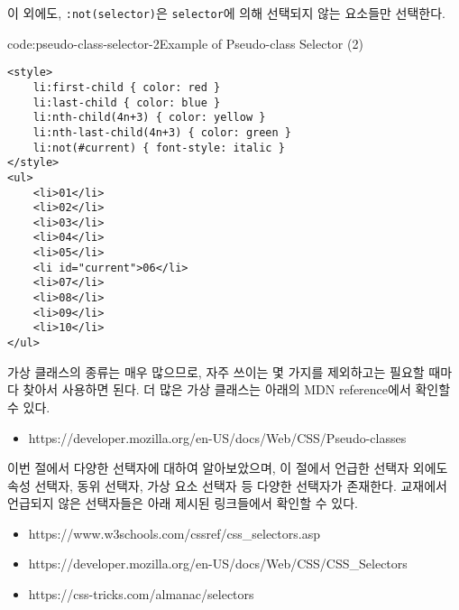 이 외에도, \texttt{:not(selector)}은 \texttt{selector}에 의해 선택되지 않는 요소들만 선택한다.

\begin{codeenv}{code:pseudo-class-selector-2}{Example of Pseudo-class Selector (2)}\begin{verbatim}
<style>
    li:first-child { color: red }
    li:last-child { color: blue }
    li:nth-child(4n+3) { color: yellow }
    li:nth-last-child(4n+3) { color: green }
    li:not(#current) { font-style: italic }
</style>
<ul>
    <li>01</li>
    <li>02</li>
    <li>03</li>
    <li>04</li>
    <li>05</li>
    <li id="current">06</li>
    <li>07</li>
    <li>08</li>
    <li>09</li>
    <li>10</li>
</ul>
\end{verbatim}
\end{codeenv}

가상 클래스의 종류는 매우 많으므로, 자주 쓰이는 몇 가지를 제외하고는 필요할 때마다 찾아서 사용하면 된다. 더 많은 가상 클래스는 아래의 MDN reference에서 확인할 수 있다. 

\begin{itemize}
    \item https://developer.mozilla.org/en-US/docs/Web/CSS/Pseudo-classes
\end{itemize}

이번 절에서 다양한 선택자에 대하여 알아보았으며, 이 절에서 언급한 선택자 외에도 속성 선택자, 동위 선택자, 가상 요소 선택자 등 다양한 선택자가 존재한다. 교재에서 언급되지 않은 선택자들은 아래 제시된 링크들에서 확인할 수 있다.

\begin{itemize}
    \item https://www.w3schools.com/cssref/css\_selectors.asp
    \item https://developer.mozilla.org/en-US/docs/Web/CSS/CSS\_Selectors
    \item https://css-tricks.com/almanac/selectors
\end{itemize}
